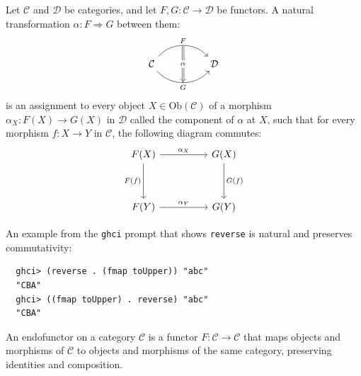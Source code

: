 \begin{definition}

  Let $\mathcal{C}$ and $\mathcal{D}$ be categories, and let $F, G : \mathcal{C} \to \mathcal{D}$ be functors. A natural transformation \( \alpha : F \Rightarrow G \) between them:
\[
  \begin{tikzcd}[row sep=huge, column sep=huge]
    \mathcal{C}
    \arrow[r, bend left=50, "F"{name=U}]
    \arrow[r, bend right=50, "G"'{name=D}]
    & \mathcal{D}
    \arrow[Rightarrow, from=U, to=D, "\alpha" description]
  \end{tikzcd}
\]
is an assignment to every object $X \in \mathrm{Ob}(\mathcal{C})$ of a morphism \( \alpha_X : F(X) \to G(X) \text{ in } \mathcal{D} \) called the component of $\alpha$ at $X$, such that for every morphism $f: X \to Y$ in $\mathcal{C}$, the following diagram commutes:
\[
  \begin{tikzcd}[row sep=huge, column sep=huge]
    F(X) \arrow[r, "\alpha_X"] \arrow[d, "F(f)"'] & G(X) \arrow[d, "G(f)"] \\
    F(Y) \arrow[r, "\alpha_Y"] & G(Y)
  \end{tikzcd}
\]
\end{definition}
\noindent An example from the \texttt{ghci} prompt that shows \texttt{reverse} is natural and preserves commutativity:
\begin{verbatim}
  ghci> (reverse . (fmap toUpper)) "abc"
  "CBA"
  ghci> ((fmap toUpper) . reverse) "abc"
  "CBA"
\end{verbatim}
\begin{definition} An endofunctor on a category $\mathcal{C}$ is a functor $ F : \mathcal{C} \to \mathcal{C} $
that maps objects and morphisms of $\mathcal{C}$ to objects and morphisms of the same category, preserving identities and composition.
\end{definition}


